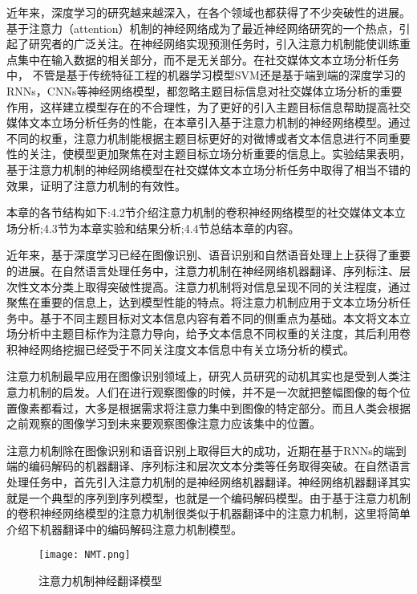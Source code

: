 

近年来，深度学习的研究越来越深入，在各个领域也都获得了不少突破性的进展。基于注意力（attention）机制的神经网络成为了最近神经网络研究的一个热点，引起了研究者的广泛关注。在神经网络实现预测任务时，引入注意力机制能使训练重点集中在输入数据的相关部分，而不是无关部分。在社交媒体文本立场分析任务中， 不管是基于传统特征工程的机器学习模型SVM还是基于端到端的深度学习的RNNs，CNNs等神经网络模型，都忽略主题目标信息对社交媒体立场分析的重要作用，这样建立模型存在的不合理性，为了更好的引入主题目标信息帮助提高社交媒体文本立场分析任务的性能，在本章引入基于注意力机制的神经网络模型。通过不同的权重，注意力机制能根据主题目标更好的对微博或者文本信息进行不同重要性的关注，使模型更加聚焦在对主题目标立场分析重要的信息上。实验结果表明，基于注意力机制的神经网络模型在社交媒体文本立场分析任务中取得了相当不错的效果，证明了注意力机制的有效性。

本章的各节结构如下:4.2节介绍注意力机制的卷积神经网络模型的社交媒体文本立场分析;4.3节为本章实验和结果分析;4.4节总结本章的内容。


近年来，基于深度学习已经在图像识别、语音识别和自然语音处理上上获得了重要的进展。在自然语言处理任务中，注意力机制在神经网络机器翻译、序列标注、层次性文本分类上取得突破性提高。注意力机制将对信息呈现不同的关注程度，通过聚焦在重要的信息上，达到模型性能的特点。将注意力机制应用于文本立场分析任务中。基于不同主题目标对文本信息内容有着不同的侧重点为基础。本文将文本立场分析中主题目标作为注意力导向，给予文本信息不同权重的关注度，其后利用卷积神经网络挖掘已经受于不同关注度文本信息中有关立场分析的模式。


注意力机制最早应用在图像识别领域上，研究人员研究的动机其实也是受到人类注意力机制的启发。人们在进行观察图像的时候，并不是一次就把整幅图像的每个位置像素都看过，大多是根据需求将注意力集中到图像的特定部分。而且人类会根据之前观察的图像学习到未来要观察图像注意力应该集中的位置。

注意力机制除在图像识别和语音识别上取得巨大的成功，近期在基于RNNs的端到端的编码解码的机器翻译、序列标注和层次文本分类等任务取得突破。在自然语言处理任务中，首先引入注意力机制的是神经网络机器翻译。神经网络机器翻译其实就是一个典型的序列到序列模型，也就是一个编码解码模型﻿。由于基于注意力机制的卷积神经网络模型的注意力机制很类似于机器翻译中的注意力机制，这里将简单介绍下机器翻译中的编码解码注意力机制模型。
\begin{figure}[htbp]
	\centering
	\texttt{[image: NMT.png]}
	\caption[rnn_vanish]{注意力机制神经翻译模型}
\end{figure}

